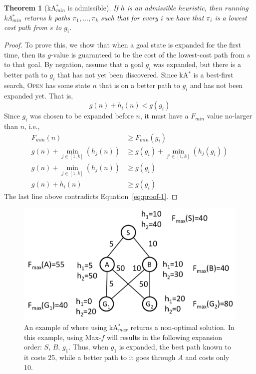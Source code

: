 \documentclass{aicom2e}
\newtheorem{theorem}{Theorem}
\newcommand{\kastar}{kA$^*$}
\newcommand{\kastarmin}{kA$^*_{min}$}
\newcommand{\kastarmax}{kA$^*_{max}$}
\newcommand{\open}{\textsc{Open}}
\begin{document}

\begin{theorem}[\kastarmin{} is admissible]
If $h$ is an admissible heuristic, then running \kastarmin{} returns $k$ paths
$\pi_1,\ldots, \pi_k$ such that for every $i$ we have that $\pi_i$ is a lowest cost
path from $s$ to $g_i$. \label{the:min-f}
\end{theorem}
 \begin{proof}
To prove this, we show that when a goal state is expanded for the first time,
then its $g$-value is guaranteed to be the cost of the lowest-cost path from
$s$ to that goal. By negation, assume that a goal $g_i$ was expanded, but there
is a better path to $g_i$ that has not yet been discovered. Since \kastar{} is
a best-first search, \open{} has some state $n$ that is on a better path to
$g_i$ and has not been expanded yet. That is,
\begin{equation}
g(n)+h_i(n)<g(g_i)
\label{eq:proof-1}
\end{equation}
Since $g_i$ was chosen to be expanded before $n$, it must have a $F_{min}$ value no-larger than $n$, i.e.,
\begin{align}
F_{min}(n) &\geq  F_{min}(g_i)\\
g(n)+\min_{j\in [1,k]}(h_j(n))& \geq  g(g_i)+\min_{j'\in [1,k]}(h_j(g_i))\\
g(n)+\min_{j\in [1,k]}(h_j(n))& \geq  g(g_i)\\
g(n)+h_i(n) &\geq  g(g_i)
\end{align}
The last line above contradicts Equation~\ref{eq:proof-1}.
\end{proof}


 
 \begin{figure}
 \includegraphics[width=\columnwidth]{max-bad_cropped.pdf}      
 \caption{An example of where using \kastarmax{} returns a non-optimal solution. In this example, 
 using Max-$f$ will results in the following expansion order: $S$, $B$, $g_1$. 
 Thus, when $g_1$ is expanded, the best path known to it costs 25, while a 
 better path to it goes through $A$ and costs only 10.}
 \label{fig:max-bad}
 \end{figure}
 
\end{document}
